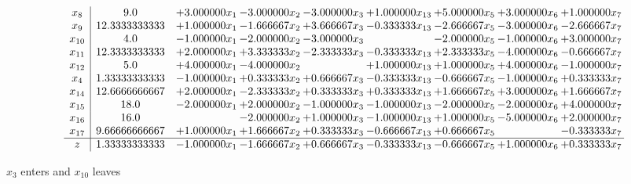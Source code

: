 \documentclass[10pt]{article}
\begin{document}
 \[\begin{array}{c| c c@{\hskip 2pt} c@{\hskip 2pt} c@{\hskip 2pt} c@{\hskip 2pt} c@{\hskip 2pt} c@{\hskip 2pt} c@{\hskip 2pt} }
 x_{8}   &  9.0 & + 3.000000 x_{1} & -3.000000 x_{2} & -3.000000 x_{3} & + 1.000000 x_{13} & + 5.000000 x_{5} & + 3.000000 x_{6} & + 1.000000 x_{7}\\
 x_{9}   &  12.3333333333 & + 1.000000 x_{1} & -1.666667 x_{2} & + 3.666667 x_{3} & -0.333333 x_{13} & -2.666667 x_{5} & -3.000000 x_{6} & -2.666667 x_{7}\\
 x_{10}   &  4.0 & -1.000000 x_{1} & -2.000000 x_{2} & -3.000000 x_{3} &   & -2.000000 x_{5} & -1.000000 x_{6} & + 3.000000 x_{7}\\
 x_{11}   &  12.3333333333 & + 2.000000 x_{1} & + 3.333333 x_{2} & -2.333333 x_{3} & -0.333333 x_{13} & + 2.333333 x_{5} & -4.000000 x_{6} & -0.666667 x_{7}\\
 x_{12}   &  5.0 & + 4.000000 x_{1} & -4.000000 x_{2} &   & + 1.000000 x_{13} & + 1.000000 x_{5} & + 4.000000 x_{6} & -1.000000 x_{7}\\
 x_{4}   &  1.33333333333 & -1.000000 x_{1} & + 0.333333 x_{2} & + 0.666667 x_{3} & -0.333333 x_{13} & -0.666667 x_{5} & -1.000000 x_{6} & + 0.333333 x_{7}\\
 x_{14}   &  12.6666666667 & + 2.000000 x_{1} & -2.333333 x_{2} & + 0.333333 x_{3} & + 0.333333 x_{13} & + 1.666667 x_{5} & + 3.000000 x_{6} & + 1.666667 x_{7}\\
 x_{15}   &  18.0 & -2.000000 x_{1} & + 2.000000 x_{2} & -1.000000 x_{3} & -1.000000 x_{13} & -2.000000 x_{5} & -2.000000 x_{6} & + 4.000000 x_{7}\\
 x_{16}   &  16.0  &   & -2.000000 x_{2} & + 1.000000 x_{3} & -1.000000 x_{13} & + 1.000000 x_{5} & -5.000000 x_{6} & + 2.000000 x_{7}\\
 x_{17}   &  9.66666666667 & + 1.000000 x_{1} & + 1.666667 x_{2} & + 0.333333 x_{3} & -0.666667 x_{13} & + 0.666667 x_{5} &   & -0.333333 x_{7}\\
\hline
z    &  1.33333333333 & -1.000000 x_{1} & -1.666667 x_{2} & + 0.666667 x_{3} & -0.333333 x_{13} & -0.666667 x_{5} & + 1.000000 x_{6} & + 0.333333 x_{7}\\
\end{array}\]


 $ x_{3} $ enters and $ x_{10} $ leaves 
\end{document}
